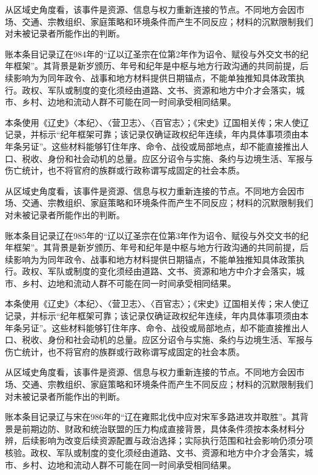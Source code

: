 从区域史角度看，该事件是资源、信息与权力重新连接的节点。不同地方会因市场、交通、宗教组织、家庭策略和环境条件而产生不同反应；材料的沉默限制我们对未被记录者所能作出的判断。

账本条目记录辽在984年的“辽以辽圣宗在位第2年作为诏令、赋役与外交文书的纪年框架”。其背景是新岁颁历、年号和纪年是中枢与地方行政沟通的共同前提，后续影响为为同年政令、战事和地方材料提供日期锚点，不能单独推知具体政策执行。政权、军队或制度的变化须经由道路、文书、资源和地方中介才会落实，城市、乡村、边地和流动人群不可能在同一时间承受相同结果。

本条使用《辽史》〈本纪〉、〈营卫志〉、〈百官志〉；《宋史》辽国相关传；宋人使辽记录，并标示“纪年框架可靠；该记录仅确证政权纪年连续，年内具体事项须由本年条另证”。这些材料能够钉住年序、命令、战役或局部地点，却不能直接推出人口、税收、身份和社会动机的总量。应区分诏令与实施、条约与边境生活、军报与伤亡统计，也不将官府的族群或行政称谓写成固定的社会本质。

从区域史角度看，该事件是资源、信息与权力重新连接的节点。不同地方会因市场、交通、宗教组织、家庭策略和环境条件而产生不同反应；材料的沉默限制我们对未被记录者所能作出的判断。

账本条目记录辽在985年的“辽以辽圣宗在位第3年作为诏令、赋役与外交文书的纪年框架”。其背景是新岁颁历、年号和纪年是中枢与地方行政沟通的共同前提，后续影响为为同年政令、战事和地方材料提供日期锚点，不能单独推知具体政策执行。政权、军队或制度的变化须经由道路、文书、资源和地方中介才会落实，城市、乡村、边地和流动人群不可能在同一时间承受相同结果。

本条使用《辽史》〈本纪〉、〈营卫志〉、〈百官志〉；《宋史》辽国相关传；宋人使辽记录，并标示“纪年框架可靠；该记录仅确证政权纪年连续，年内具体事项须由本年条另证”。这些材料能够钉住年序、命令、战役或局部地点，却不能直接推出人口、税收、身份和社会动机的总量。应区分诏令与实施、条约与边境生活、军报与伤亡统计，也不将官府的族群或行政称谓写成固定的社会本质。

从区域史角度看，该事件是资源、信息与权力重新连接的节点。不同地方会因市场、交通、宗教组织、家庭策略和环境条件而产生不同反应；材料的沉默限制我们对未被记录者所能作出的判断。

账本条目记录辽与宋在986年的“辽在雍熙北伐中应对宋军多路进攻并取胜”。其背景是前期边防、财政和统治联盟的压力构成直接背景，具体条件须按本条材料分辨，后续影响为改变后续资源配置与政治选择；实际执行范围和社会影响仍须分项核验。政权、军队或制度的变化须经由道路、文书、资源和地方中介才会落实，城市、乡村、边地和流动人群不可能在同一时间承受相同结果。

